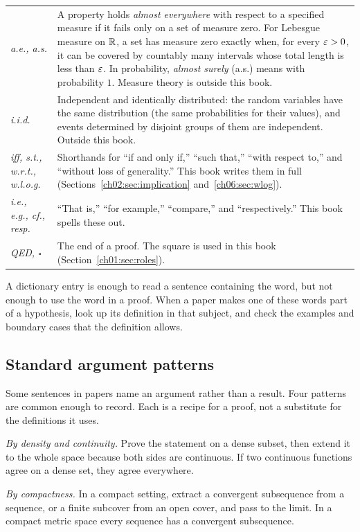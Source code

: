 \begin{longtable}{@{}>{\raggedright\arraybackslash}p{1.35in}>{\raggedright\arraybackslash}p{3.85in}@{}}
\emph{a.e., a.s.} & A property holds \emph{almost everywhere} with respect to a specified measure if it fails only on a set of measure zero. For Lebesgue measure on $\mathbb R$, a set has measure zero exactly when, for every $\varepsilon>0$, it can be covered by countably many intervals whose total length is less than $\varepsilon$. In probability, \emph{almost surely} (a.s.) means with probability $1$. Measure theory is outside this book.\\
\emph{i.i.d.} & Independent and identically distributed: the random variables have the same distribution (the same probabilities for their values), and events determined by disjoint groups of them are independent. Outside this book.\\
\emph{iff, s.t., w.r.t., w.l.o.g.} & Shorthands for ``if and only if,'' ``such that,'' ``with respect to,'' and ``without loss of generality.'' This book writes them in full (Sections~\ref{ch02:sec:implication} and~\ref{ch06:sec:wlog}).\\
\emph{i.e., e.g., cf., resp.} & ``That is,'' ``for example,'' ``compare,'' and ``respectively.'' This book spells these out.\\
\emph{QED, $\square$} & The end of a proof. The square is used in this book (Section~\ref{ch01:sec:roles}).\\
\bottomrule
\end{longtable}

A dictionary entry is enough to read a sentence containing the word, but not enough to use the word in a proof. When a paper makes one of these words part of a hypothesis, look up its definition in that subject, and check the examples and boundary cases that the definition allows.

\subsection*{Standard argument patterns}
Some sentences in papers name an argument rather than a result. Four patterns are common enough to record. Each is a recipe for a proof, not a substitute for the definitions it uses.

\emph{By density and continuity.} Prove the statement on a dense subset, then extend it to the whole space because both sides are continuous. If two continuous functions agree on a dense set, they agree everywhere.

\emph{By compactness.} In a compact setting, extract a convergent subsequence from a sequence, or a finite subcover from an open cover, and pass to the limit. In a compact metric space every sequence has a convergent subsequence.


